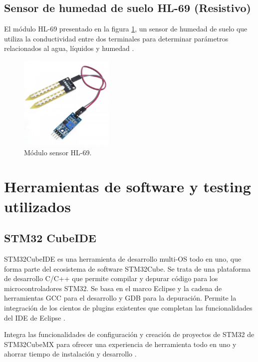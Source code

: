 \subsection{Sensor de humedad de suelo HL-69 (Resistivo)}
El módulo HL-69 presentado en la figura \ref{fig:SensorHL-69}, un sensor de humedad de suelo que utiliza la conductividad entre dos terminales para determinar parámetros relacionados al agua, líquidos y humedad \citep{ModuloHL-69}.
\begin{figure}[htbp]
	\centering
	\includegraphics[width=4.5cm, height=4.5cm]{./Figures/sensordehumedad.jpg}
	\caption{Módulo sensor HL-69\protect\footnotemark.}
	\label{fig:SensorHL-69}
\end{figure}

\section{Herramientas de software y testing utilizados}
\subsection{STM32 CubeIDE}
STM32CubeIDE es una herramienta de desarrollo multi-OS todo en uno, que forma parte del ecosistema de software STM32Cube. Se trata de una plataforma de desarrollo C/C++ que permite compilar y depurar código para los microcontroladores STM32. Se basa en el marco Eclipse  y la cadena de herramientas GCC para el desarrollo y GDB para la depuración. Permite la integración de los cientos de plugins existentes que completan las funcionalidades del IDE de Eclipse \citep{STM32CUBEIDE}.

Integra las funcionalidades de configuración y creación de proyectos de STM32 de STM32CubeMX para ofrecer una experiencia de herramienta todo en uno y ahorrar tiempo de instalación y desarrollo \citep{STM32CUBEIDE}.

